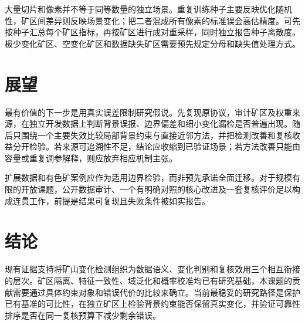 \documentclass[UTF8,a4paper,11pt]{ctexart}
\begin{document}
大量切片和像素并不等于同等数量的独立场景。重复训练种子主要反映优化随机性，矿区间差异则反映场景变化；把二者混成所有像素的标准误会高估精度。可先按种子汇总每个矿区指标，再按矿区进行成对重采样，同时独立报告种子离散度。极少变化矿区、空变化矿区和数据缺失矿区需要预先规定分母和缺失值处理方式。

\section{展望}
最有价值的下一步是用真实误差限制研究假说。先复现原协议，审计矿区及权重来源，在独立开发数据上判断背景误报、边界偏差和细小变化漏检是否普遍出现。随后只围绕一个主要失效比较局部背景约束与直接近邻方法，并把检测改善和复核收益分开检验。若来源可追溯性不足，结论应收缩到已验证场景；若方法改善只能由容量或重复调参解释，则应放弃相应机制主张。

扩展数据和有色矿案例应作为适用边界检验，而非预先承诺全面迁移。对于规模有限的开放课题，公开数据审计、一个有明确对照的核心改进及一套复核评价足以构成连贯工作，前提是结果可复现且失败条件被如实报告。

\section{结论}
现有证据支持将矿山变化检测组织为数据语义、变化判别和复核效用三个相互衔接的层次。矿区隔离、特征一致性、域泛化和概率校准均已有研究基础，本课题的贡献需要通过具体约束对象和错误代价的比较来确立。当前最稳妥的研究路径是保护已有基准的可比性，在独立矿区上检验背景约束能否保留真实变化，并验证可靠性排序是否在同一复核预算下减少剩余错误。



\end{document}
